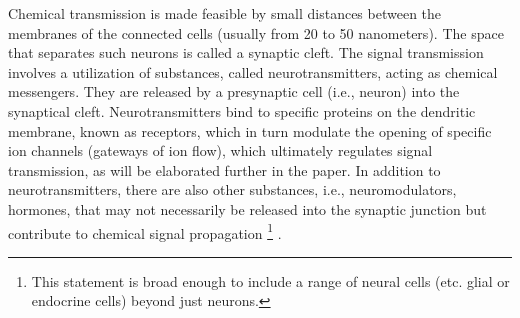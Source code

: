 \documentclass[class={myRUCProject}, crop=false]{standalone}
\begin{document}
Chemical transmission is made feasible by small distances between the membranes of the connected cells (usually from 20 to 50 nanometers). The space that separates such neurons is called a synaptic cleft. The signal transmission involves a utilization of substances, called neurotransmitters, acting as chemical messengers. They are released by a presynaptic cell (i.e., neuron) into the synaptical cleft. Neurotransmitters bind to specific proteins on the dendritic membrane, known as receptors, which in turn modulate the opening of specific ion channels (gateways of ion flow), which ultimately regulates signal transmission, as will be elaborated further in the paper. In addition to neurotransmitters, there are also other substances, i.e., neuromodulators, hormones, that may not necessarily be released into the synaptic junction but contribute to chemical signal propagation \footnote{This statement is broad enough to include a range of neural cells (etc. glial or endocrine cells) beyond just neurons.} \cite{Hyman2005}.

\end{document}
